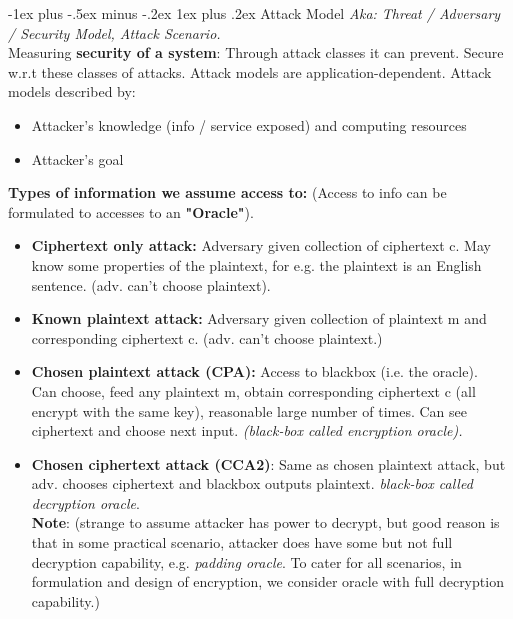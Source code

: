 \documentclass[10pt, landscape]{article}
\makeatletter
\renewcommand{\subsubsection}{\@startsection{subsubsection}{3}{0mm}%
                                {-1ex plus -.5ex minus -.2ex}%
                                {1ex plus .2ex}%
                                {\normalfont\small\bfseries}}
\makeatother
\begin{document}
\begin{multicols*}{3}
\subsubsection{Attack Model}
\textit{Aka: Threat / Adversary / Security Model, Attack Scenario.} \\
Measuring \textbf{security of a system}: Through attack classes it can prevent. Secure w.r.t these classes of attacks. Attack models are application-dependent. Attack models described by:
\begin{itemize}
\item Attacker's knowledge (info / service exposed) and computing resources
\item Attacker's goal
\end{itemize}
\textbf{Types of information we assume access to:} (Access to info can be formulated to accesses to an \textbf{"Oracle"}).
\begin{itemize}
\item \textbf{Ciphertext only attack:} Adversary given collection of ciphertext c. May know some properties 
of the plaintext, for e.g. the plaintext is an English sentence. (adv. can’t choose plaintext).
\item \textbf{Known plaintext attack:} Adversary given collection of plaintext m and corresponding ciphertext c. (adv. can’t choose plaintext.)
\item \textbf{Chosen plaintext attack (CPA):} Access to blackbox (i.e. the oracle). \\
Can choose, feed any plaintext m, obtain corresponding ciphertext c (all encrypt with the same key), reasonable large number of times. Can see ciphertext and choose next input.  \textit{(black-box called encryption oracle).}
\item \textbf{Chosen ciphertext attack (CCA2)}: Same as chosen plaintext attack, but adv. chooses ciphertext and blackbox outputs plaintext. \textit{black-box called decryption oracle}. \\
\textbf{Note}: (strange to assume attacker has power to decrypt, but good reason is that in some practical scenario, attacker does have some but not full decryption capability, e.g. \textit{padding oracle}. To cater for all scenarios, in formulation and design of encryption, we consider oracle with full decryption capability.)
\end{itemize}


\end{multicols*}
\end{document}
